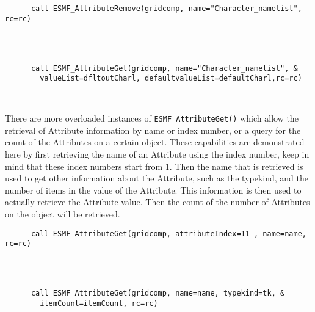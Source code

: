  \begin{verbatim}

                    
      call ESMF_AttributeRemove(gridcomp, name="Character_namelist", rc=rc)
 
\end{verbatim}
 

 \begin{verbatim}

      
      call ESMF_AttributeGet(gridcomp, name="Character_namelist", &
        valueList=dfltoutCharl, defaultvalueList=defaultCharl,rc=rc)

 
\end{verbatim}
 

      There are more overloaded instances of {\tt ESMF\_AttributeGet()} 
      which allow the retrieval of Attribute information by name or index 
      number, or a query for the count of the Attributes on a certain object.  
      These capabilities are demonstrated here by first retrieving the name of
      an Attribute using the index number, keep in mind that these index
      numbers start from 1.  Then the name that is retrieved
      is used to get other information about the Attribute, such as the
      typekind, and the number of items in the value of the Attribute.
      This information is then used to actually retrieve the Attribute value.
      Then the count of the number of Attributes on the object will be retrieved. 

 \begin{verbatim}
      call ESMF_AttributeGet(gridcomp, attributeIndex=11 , name=name, rc=rc)
 
\end{verbatim}
 

 \begin{verbatim}

      
      call ESMF_AttributeGet(gridcomp, name=name, typekind=tk, &
        itemCount=itemCount, rc=rc)
 
\end{verbatim}
 

